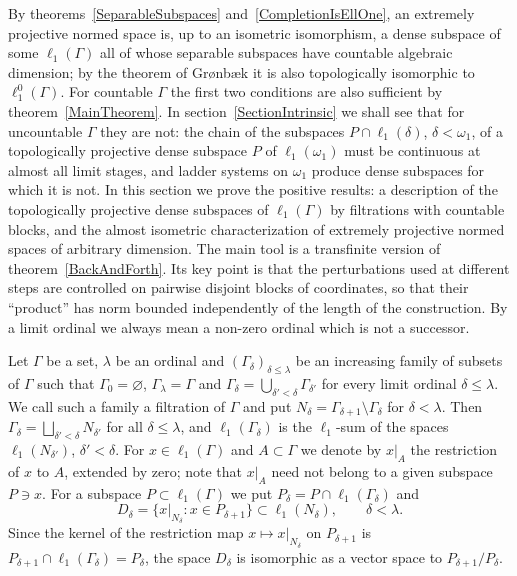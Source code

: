 \documentclass[12pt]{article}
\newcommand{\lo}[1]{\ell_1^0(#1)}
\newcommand{\ellone}[1]{\ell_1(#1)}
\begin{document}
By theorems~\ref{SeparableSubspaces} and~\ref{CompletionIsEllOne}, an
extremely projective normed space is, up to an isometric isomorphism, a
dense subspace of some $\ellone{\Gamma}$ all of whose separable subspaces have
countable algebraic dimension; by the theorem of Gr{\o}nb{\ae}k it is also
topologically isomorphic to $\lo{\Gamma}$. For countable $\Gamma$ the first
two conditions are also sufficient by theorem~\ref{MainTheorem}. In section~\ref{SectionIntrinsic} we shall see that
for uncountable $\Gamma$ they are not: the chain of the subspaces
$P\cap\ellone{\delta}$, $\delta<\omega_1$, of a topologically projective
dense subspace $P$ of $\ellone{\omega_1}$ must be continuous at almost all
limit stages, and ladder systems on $\omega_1$ produce dense subspaces for
which it is not. In this section we prove the positive results: a
description of the topologically projective dense subspaces of
$\ellone{\Gamma}$ by filtrations with countable blocks, and the almost
isometric characterization of extremely projective normed spaces of
arbitrary dimension. The main tool is a transfinite version of
theorem~\ref{BackAndForth}. Its key point is that the perturbations used at
different steps are controlled on pairwise disjoint blocks of coordinates,
so that their ``product'' has norm bounded independently of the length of
the construction. By a limit ordinal we always mean a non-zero ordinal which
is not a successor.

Let $\Gamma$ be a set, $\lambda$ be an ordinal and ${(\Gamma_\delta)}_{\delta\leq\lambda}$
be an increasing family of subsets of $\Gamma$ such that $\Gamma_0=\varnothing$,
$\Gamma_\lambda=\Gamma$ and $\Gamma_\delta=\bigcup_{\delta'<\delta}\Gamma_{\delta'}$
for every limit ordinal $\delta\leq\lambda$. We call such a family a
filtration of $\Gamma$ and put $N_\delta=\Gamma_{\delta+1}\setminus\Gamma_\delta$
for $\delta<\lambda$. Then $\Gamma_\delta=\bigsqcup_{\delta'<\delta}N_{\delta'}$
for all $\delta\leq\lambda$, and $\ellone{\Gamma_\delta}$ is the $\ell_1$-sum of
the spaces $\ellone{N_{\delta'}}$, $\delta'<\delta$. For $x\in\ellone{\Gamma}$
and $A\subset\Gamma$ we denote by $x|_A$ the restriction of $x$ to $A$,
extended by zero; note that $x|_A$ need not belong to a given subspace
$P\ni x$. For a subspace $P\subset\ellone{\Gamma}$ we put
$P_\delta=P\cap\ellone{\Gamma_\delta}$ and
\[
D_\delta=\{x|_{N_\delta}:x\in P_{\delta+1}\}\subset\ellone{N_\delta},
\qquad \delta<\lambda.
\]
Since the kernel of the restriction map $x\mapsto x|_{N_\delta}$ on
$P_{\delta+1}$ is $P_{\delta+1}\cap\ellone{\Gamma_\delta}=P_\delta$, the space
$D_\delta$ is isomorphic as a vector space to $P_{\delta+1}/P_\delta$.
\end{document}
